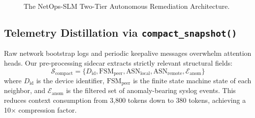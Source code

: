 \documentclass[conference]{IEEEtran}
\begin{document}
\begin{figure}[htbp]
\centering
{}
\caption{The NetOps-SLM Two-Tier Autonomous Remediation Architecture.}
\label{fig:arch}
\end{figure}

\subsection{Telemetry Distillation via \texttt{compact\_snapshot()}}
Raw network bootstrap logs and periodic keepalive messages overwhelm attention heads. Our pre-processing sidecar extracts strictly relevant structural fields:
\begin{equation}
\mathcal{S}_{\text{compact}} = \{ D_{\text{id}}, \text{FSM}_{\text{peer}}, \text{ASN}_{\text{local}}, \text{ASN}_{\text{remote}}, \mathcal{E}_{\text{anom}} \}
\end{equation}
where $D_{\text{id}}$ is the device identifier, $\text{FSM}_{\text{peer}}$ is the finite state machine state of each neighbor, and $\mathcal{E}_{\text{anom}}$ is the filtered set of anomaly-bearing syslog events. This reduces context consumption from 3,800 tokens down to 380 tokens, achieving a 10$\times$ compression factor.
\end{document}
